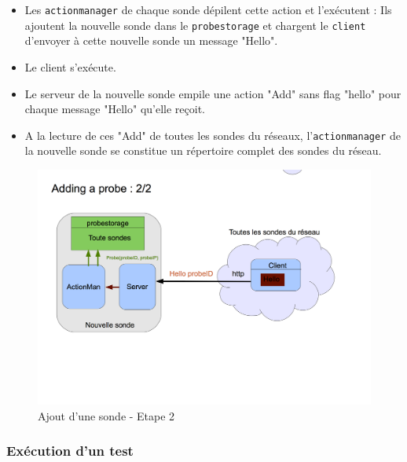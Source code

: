 \documentclass[a4paper,11pt]{article}
\begin{document}
\begin{itemize}
\item Les \texttt{actionmanager} de chaque sonde dépilent cette action et l'exécutent : Ils ajoutent la nouvelle sonde dans le \texttt{probestorage} et chargent le \texttt{client} d'envoyer à cette nouvelle sonde un message "Hello".
\item Le client s'exécute.
\item Le serveur de la nouvelle sonde empile une action "Add" sans flag "hello" pour chaque message "Hello" qu'elle reçoit.
\item A la lecture de ces "Add" de toutes les sondes du réseaux, l'\texttt{actionmanager} de la nouvelle sonde se constitue un répertoire complet des sondes du réseau.
\end{itemize}





\begin{figure}[!ht]
\centering\includegraphics[width=\linewidth]{img/graphAdd2.png}
\caption{Ajout d'une sonde - Etape 2}
\end{figure}

\FloatBarrier
\subsubsection{Exécution d'un test}
\end{document}

